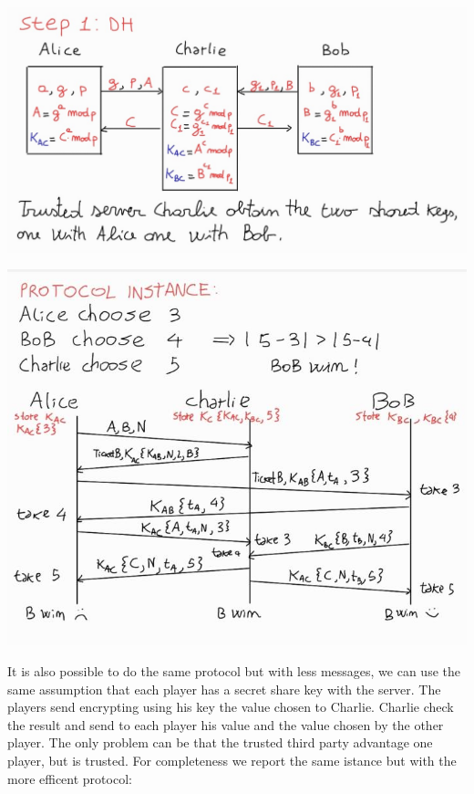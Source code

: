 \documentclass{article}
\begin{document}
\begin{center}
\includegraphics[scale=0.4]{HW06-1884749-2}
\end{center}
\begin{center}
\includegraphics[scale=0.4]{HW06-1884749}
\end{center}
It is also possible to do the same protocol but with less messages, we can use the same assumption that each player has a secret share key with the server. The players send encrypting using his key the value chosen to Charlie. Charlie check the result and send to each player his value and the value chosen by the other player. The only problem can be that the trusted third party advantage one player, but is trusted. For completeness we report the same istance but with the more efficent protocol:\\
\end{document}
